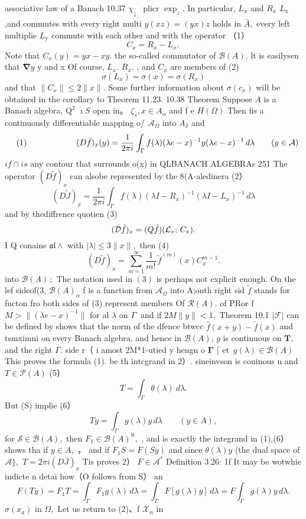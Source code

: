 associative law of a Banach 10.37 $\chi_{\downarrow_{-}}$ plicr $\textstyle\exp_{z}.$ In particular, $L_{x}$ and $\textstyle R_{x}$ $L_{\mathrm{x}}$ ,and commutes with every right multi $y(x z)=(y x)z$ holds in ${\bar{A}},$ every left multiplie $L_{\mathrm{y}}$ commute with each other and with the operator （1） $$ C_{x}=R_{x}-L_{x}.\, $$ Note that $C_{x}(y)=y x-x y.$ the so-called commutator of ${\mathcal{B}}(A).$ lt is easilysen that $\mathbf{\nabla}y$ y and x Of course, $L_{x}.$ $R_{x}.$ , and $C_{x}$ are members of (2) $$ \sigma(L_{x})=\sigma(x)=\sigma(R_{x}) $$ and that $\|C_{x}\|\leq2\|x\|.$ Some further information about $\sigma(c_{x})$ will be obtained in the corollary to Theorem 11.23. 10.38 Theorem Suppose $\scriptstyle A$ is a Banach algebra, $\mathrm{Q^{2}}$ $\dot{\boldsymbol{\imath}}S$ open in。 $\zeta_{s},x\in A_{\alpha}$ and f e $H(\Omega)$ Then fis a continuously differentiable mapping o/ ${\mathcal{A}}_{\Omega}$ into $A_{\mathrm{{J}}}$ and $$ \quad(1)\qquad\qquad\qquad(D\bar{f})_{x}(y)=\frac{1}{2\pi i}\int_{{\Gamma}}f(\lambda)(\lambda e-x)^{-1}y(\lambda e-x)^{-1}\,d\lambda\qquad(y\in{\cal A}) $$ $i f\cap i s$ any contour that surrounds o(x) in QLBANACH ALGEBRAs 251 The operator $(D{\tilde{f}})_{x}$ can alsobe represented by the 8(A-aledinera (2） $$ (D{\tilde{J}})_{x}={\frac{1}{2\pi i}}\int_{\Gamma}f(\lambda)(\lambda I-R_{x})^{-1}(\lambda I-L_{x})^{-1}\,d\lambda $$ and by thediffrence quotien (3) $$ ({\cal D}\tilde{f})_{x}=(Q\tilde{f})({\cal L}_{x};\,C_{x}). $$ I Q conains ${\mathfrak{a l}}\wedge$ with $|\lambda|\leq3\|x\|,$ then (4) $$ (D\tilde{f})_{x}=\sum_{m=1}^{\infty}\frac{1}{m!}\,\tilde{f}^{(m)}(x)C_{x}^{m-1}. $$ into ${\mathcal{B}}(A)\,;$ The notation used in $(3)$ is perhaps not explicit enough. On the lef sideof(3, ${\mathcal{B}}(A)_{\alpha}$ f is a function from ${\mathcal{A}}_{\Omega}$ into A;onth right sid $\tilde{f}$ stands for fucton fro both sides of (3) represent members Of ${\mathcal{R}}(A).$ of PRor f $M>\|(\lambda e-x)^{-1}\|$ for al $\lambda$ on ${\mit\Gamma}$ and if $2M\|y\|<1,$ Theorem 10.1 $\left|{\mathcal{F}}\right|$ can be defined by shows that the norm of the dfence btwcc ${\hat{f}}(x+y)-{\tilde{f}}(x)$ and tsmximni on every Banach algebra, and hence in ${\mathcal{B}}(A),\,g$ is continuous on $\mathbf{T},$ and the right $\textstyle\Gamma.$ side r（ i amost 2M*1-utied y hengn o ${\boldsymbol{\Gamma}}$ $\lceil\operatorname{et}\ g(\lambda)\in{\mathcal{B}}(A)$ This proves the formula (1). be th intcgrand in 2）. sineinvson is coninous n and $T\in{\mathcal{P}}(A)$ (5） $$ T=\int_{\Gamma}\theta(\lambda)\ d\lambda. $$ But (S) implie (6） $$ T y=\int_{\Gamma}g(\lambda)y\,d\lambda\qquad(y\in A), $$ for ${\mathcal{S}}\in{\mathcal{B}}(A),$ then $F_{1}\in{\mathcal{B}}(A)^{\aleph},$ , and is exactly the integrand in (1),(6） shows tha if $y\in A,$ ， and if $F_{1}S=F(S y)$ and since $\theta(\lambda)y$ (the dual space of ${\mathcal{A}}{\big\}},$ $T=2\pi i(D{\bar{J}})_{x}$ Tis proves 2） $F\in{\mathcal{A}}^{*}$ Definition 3.26: 1f It may be wotwhie indicte n detai how（O follows from S） an $$ F(T y)=F_{1}T=\int_{\Gamma}F_{1}g(\lambda)\,d\lambda=\int_{\Gamma}F[g(\lambda)y]\,d\lambda=F\int_{\Gamma}g(\lambda)y\,d\lambda. $$ $\sigma(x_{a})$ in $\Omega,$ Let us return to (2)、f ${\mathcal{X}}_{n}$ in 
